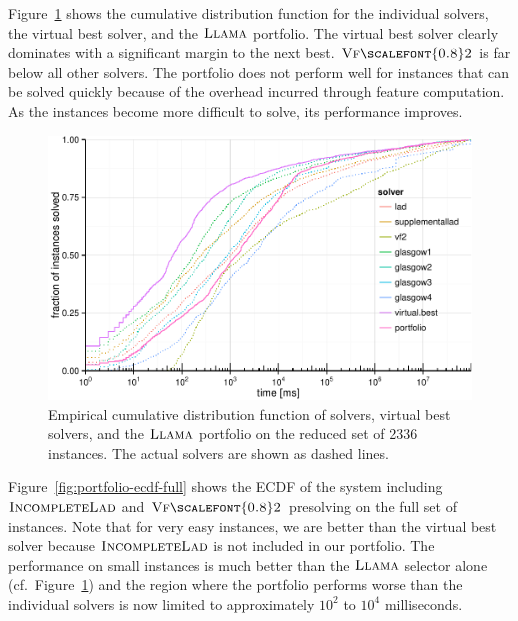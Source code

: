 \documentclass{llncs}
\newcommand{\VFtwo}{$\textsc{Vf{\scalefont{0.8}2}}$\xspace}
\newcommand{\IncompleteLAD}{$\textsc{IncompleteLad}$\xspace}
\newcommand{\LLAMA}{$\textsc{Llama}$\xspace}
\begin{document}
Figure~\ref{fig:portfolio-ecdf} shows the cumulative distribution function for
the individual solvers, the virtual best solver, and the \LLAMA portfolio. The
virtual best solver clearly dominates with a significant margin to the next
best. \VFtwo is far below all other solvers. The portfolio does not perform well
for instances that can be solved quickly because of the overhead incurred
through feature computation. As the instances become more difficult to solve,
its performance improves.

\begin{figure}[!ht]
\includegraphics[width=\textwidth]{figures/portfolio-ecdf}
\caption{Empirical cumulative distribution function of solvers, virtual best
solvers, and the \LLAMA portfolio on the reduced set of 2336 instances. The
actual solvers are shown as dashed lines.}
\label{fig:portfolio-ecdf}
\end{figure}

Figure~\ref{fig:portfolio-ecdf-full} shows the ECDF of the system including
\IncompleteLAD and \VFtwo presolving on the full set of instances. Note that for
very easy instances, we are better than the virtual best solver because
\IncompleteLAD is not included in our portfolio. The performance on small
instances is much better than the \LLAMA selector alone (cf.\
Figure~\ref{fig:portfolio-ecdf}) and the region where the portfolio performs
worse than the individual solvers is now limited to approximately $10^2$ to
$10^4$ milliseconds.
\end{document}
